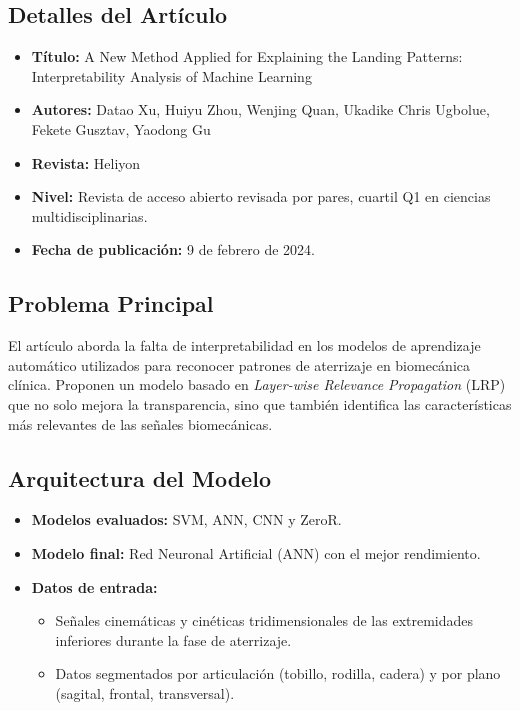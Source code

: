 \documentclass{report}
\begin{document}
\subsection{Detalles del Artículo}
\begin{itemize}
    \item \textbf{Título:} A New Method Applied for Explaining the Landing Patterns: Interpretability Analysis of Machine Learning
    \item \textbf{Autores:} Datao Xu, Huiyu Zhou, Wenjing Quan, Ukadike Chris Ugbolue, Fekete Gusztav, Yaodong Gu
    \item \textbf{Revista:} Heliyon
    \item \textbf{Nivel:} Revista de acceso abierto revisada por pares, cuartil Q1 en ciencias multidisciplinarias.
    \item \textbf{Fecha de publicación:} 9 de febrero de 2024.
\end{itemize}

\subsection{Problema Principal}
El artículo aborda la falta de interpretabilidad en los modelos de aprendizaje automático utilizados para reconocer patrones de aterrizaje en biomecánica clínica. Proponen un modelo basado en \textit{Layer-wise Relevance Propagation} (LRP) que no solo mejora la transparencia, sino que también identifica las características más relevantes de las señales biomecánicas.

\subsection{Arquitectura del Modelo}
\begin{itemize}
    \item \textbf{Modelos evaluados:} SVM, ANN, CNN y ZeroR.
    \item \textbf{Modelo final:} Red Neuronal Artificial (ANN) con el mejor rendimiento.
    \item \textbf{Datos de entrada:}
    \begin{itemize}
        \item Señales cinemáticas y cinéticas tridimensionales de las extremidades inferiores durante la fase de aterrizaje.
        \item Datos segmentados por articulación (tobillo, rodilla, cadera) y por plano (sagital, frontal, transversal).
    \end{itemize}
\end{itemize}
\end{document}
